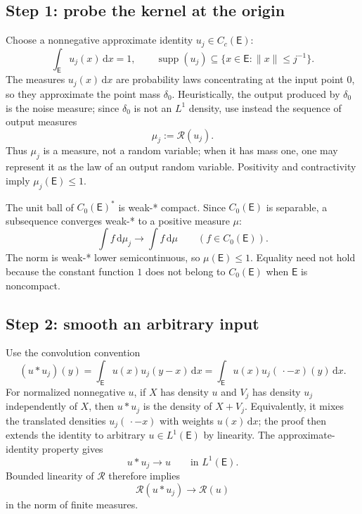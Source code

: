 \documentclass[11pt]{article}
\newcommand{\dd}{\,\mathrm d}
\begin{document}
\subsection*{Step 1: probe the kernel at the origin}

Choose a nonnegative approximate identity $u_j\in C_c(\mathsf E)$:
\[
  \int_{\mathsf E}u_j(x)\dd x=1,
  \qquad
  \operatorname{supp}(u_j)
  \subseteq\{x\in\mathsf E:\|x\|\leq j^{-1}\}.
\]
The measures $u_j(x)\dd x$ are probability laws concentrating at the input
point $0$, so they approximate the point mass $\delta_0$.  Heuristically,
the output produced by $\delta_0$ is the noise measure; since $\delta_0$ is
not an $L^1$ density, use instead the sequence of output measures
\[
  \mu_j:=\mathcal R(u_j).
\]
Thus $\mu_j$ is a measure, not a random variable; when it has mass one, one
may represent it as the law of an output random variable.  Positivity and
contractivity imply $\mu_j(\mathsf E)\leq1$.

The unit ball of $C_0(\mathsf E)^*$ is weak-* compact.  Since $C_0(\mathsf E)$ is
separable, a subsequence converges weak-* to a positive measure $\mu$:
\begin{equation}\label{eq:mu-limit}
  \int f\dd\mu_j\longrightarrow\int f\dd\mu
  \qquad(f\in C_0(\mathsf E)).
\end{equation}
The norm is weak-* lower semicontinuous, so $\mu(\mathsf E)\leq1$.  Equality need
not hold because the constant function $1$ does not belong to $C_0(\mathsf E)$
when $\mathsf E$ is noncompact.

\subsection*{Step 2: smooth an arbitrary input}

Use the convolution convention
\[
  (u*u_j)(y)=\int_{\mathsf E}u(x)u_j(y-x)\dd x
  =\int_{\mathsf E}u(x)u_j(\,\cdot-x)(y)\dd x.
\]
For normalized nonnegative $u$, if $X$ has density $u$ and $V_j$ has density
$u_j$ independently of $X$, then $u*u_j$ is the density of $X+V_j$.
Equivalently, it mixes the translated densities $u_j(\,\cdot-x)$ with
weights $u(x)\dd x$; the proof then extends the identity to arbitrary
$u\in L^1(\mathsf E)$ by linearity.
The approximate-identity property gives
\begin{equation}\label{eq:L1-approx}
  u*u_j\longrightarrow u
  \qquad\text{in }L^1(\mathsf E).
\end{equation}
Bounded linearity of $\mathcal R$ therefore implies
\[
  \mathcal R(u*u_j)\longrightarrow\mathcal R(u)
\]
in the norm of finite measures.
\end{document}
